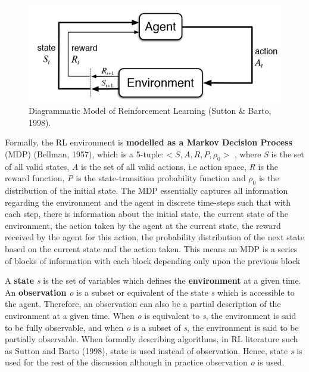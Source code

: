  
\begin{figure}[t]
\includegraphics[width=\columnwidth]{fig1.jpg} 
\caption{Diagrammatic Model of Reinforcement Learning (Sutton \& Barto, 1998).}
\end{figure}	

Formally, the RL environment is \textbf{modelled as a Markov Decision Process} (MDP) (Bellman, 1957), which is a 5-tuple:$ <\textit{S},\textit{A},\textit{R},\textit{P},\rho_{0} > $ , where \textit{S} is the set of all valid states, \textit{A} is the set of all valid actions, i.e action space, \textit{R} is the reward function, \textit{P} is the state-transition probability function and $\rho_{0} $ is the distribution of the initial state. The MDP essentially captures all information regarding the environment and the agent in discrete time-steps such that with each step, there is information about the initial state, the current state of the environment, the action taken by the agent at the current state, the reward received by the agent for this action, the probability distribution of the next state based on the current state and the action taken. This means an MDP is a series of blocks of information with each block depending only upon the previous block 

A \textbf{state} \textit{s} is the set of variables which defines the \textbf{environment} at a given time. An \textbf{observation} \textit{o} is a subset or equivalent of the state \textit{s} which is accessible to the agent. Therefore, an observation can also be a partial description of the environment at a given time. When \textit{o} is equivalent to \textit{s}, the environment is said to be fully observable, and when \textit{o} is a subset of \textit{s}, the environment is said to be partially observable. When formally describing algorithms, in RL literature such as Sutton and Barto (1998), state is used instead of observation. Hence, state \textit{s} is used for the rest of the discussion although in practice observation \textit{o} is used. 
\\

